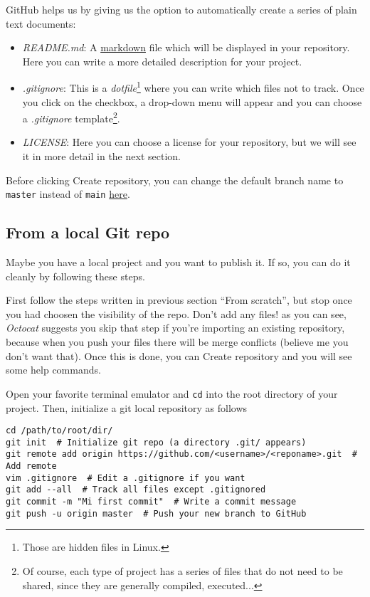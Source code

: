 \textsf{GitHub} helps us by giving us the option to automatically create a series of plain text documents:
\begin{itemize}
    \item \textit{README.md}: A \href{https://www.markdownguide.org/getting-started/}{markdown} file which will be displayed in your repository. Here you can write a more detailed description for your project.
    \item \textit{.gitignore}: This is a \textit{dotfile}\footnote{Those are hidden files in \textsf{Linux}.} where you can write which files not to track. Once you click on the checkbox, a drop-down menu will appear and you can choose a \textit{.gitignore} template\footnote{Of course, each type of project has a series of files that do not need to be shared, since they are generally compiled, executed...}.
    \item \textit{LICENSE}: Here you can choose a license for your repository, but we will see it in more detail in the next section.
\end{itemize}

Before clicking \textsf{Create repository}, you can change the default branch name to \texttt{master} instead of \texttt{main} \href{https://github.com/settings/repositories}{here}.

\subsection{From a local \textsf{Git} repo}

Maybe you have a local project and you want to publish it. If so, you can do it cleanly by following these steps.

First follow the steps written in previous section ``From scratch'', but stop once you had choosen the visibility of the repo. Don't add any files! as you can see, \textit{Octocat} suggests you skip that step if you're importing an existing repository, because when you push your files there will be merge conflicts (believe me you don't want that). Once this is done, you can \textsf{Create repository} and you will see some help commands.

Open your favorite terminal emulator and \texttt{cd} into the root directory of your project. Then, initialize a git local repository as follows

\begin{lstlisting}[style=shell]
cd /path/to/root/dir/
git init  # Initialize git repo (a directory .git/ appears)
git remote add origin https://github.com/<username>/<reponame>.git  # Add remote
vim .gitignore  # Edit a .gitignore if you want
git add --all  # Track all files except .gitignored
git commit -m "Mi first commit"  # Write a commit message 
git push -u origin master  # Push your new branch to GitHub
\end{lstlisting}



